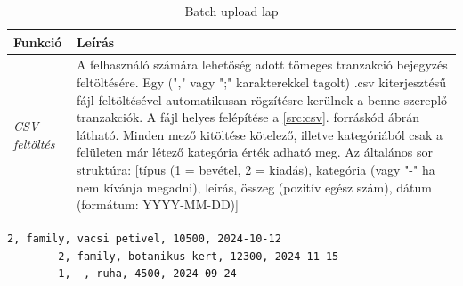 \begin{itemize}
\begin{table}[H]
		\centering
		\begin{tabular}{ | m{} | m{} | }
			\hline
			\textbf{Funkció} & \textbf{Leírás} \\
			\hline \hline
			\emph{CSV feltöltés} & A felhasználó számára lehetőség adott tömeges tranzakció bejegyzés feltöltésére. Egy ("," vagy ";" karakterekkel tagolt) .csv kiterjesztésű fájl feltöltésével automatikusan rögzítésre kerülnek a benne szereplő tranzakciók. A fájl helyes felépítése a \ref{src:csv}. forráskód ábrán látható. Minden mező kitöltése kötelező, illetve kategóriából csak a felületen már létező kategória érték adható meg.  Az általános sor struktúra: [típus (1 = bevétel, 2 = kiadás), kategória (vagy "-" ha nem kívánja megadni), leírás, összeg (pozitív egész szám), dátum (formátum: YYYY-MM-DD)]\\
			\hline
		\end{tabular}
		\caption{Batch upload lap}
		\label{tab:batch-upload}
	\end{table}
	\begin{lstlisting}[language={[Sharp]C}]
		2, family, vacsi petivel, 10500, 2024-10-12
		2, family, botanikus kert, 12300, 2024-11-15
		1, -, ruha, 4500, 2024-09-24 
	\end{lstlisting}
	

\end{itemize}
